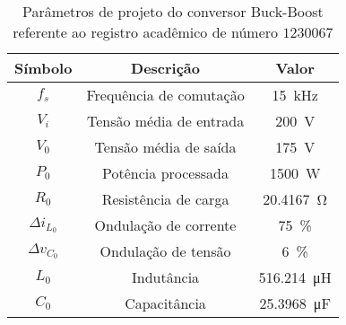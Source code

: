 \begin{table}[!ht]
\centering
\caption{Parâmetros de projeto do conversor Buck-Boost referente ao registro acadêmico de número $1230067$}
\label{tab:parametros}
\begin{tabular}{@{}ccc@{}}
\toprule
\textbf{Símbolo} & \textbf{Descrição} & \textbf{Valor}\\ \midrule
$f_s$ & Frequência de comutação & \SI{15}{\kilo\hertz}\\
$V_i$ & Tensão média de entrada  & \SI{200}{\V}\\
$V_0$ & Tensão média de saída  & \SI{175}{\V} \\
$P_0$ & Potência processada  & \SI{1500}{\W} \\
$R_0$ & Resistência de carga & \SI{20.4167}{\ohm} \\
$\Delta{i_{L_0}}$  & Ondulação de corrente & \SI{75}{\%}\\
$\Delta{v_{C_0}}$  & Ondulação de tensão & \SI{6}{\%}\\
$L_0$ & Indutância & \SI{516.214}{\micro\henry}\\
$C_0$ & Capacitância & \SI{25.3968}{\micro\farad}\\
\bottomrule
\end{tabular}
\end{table}


